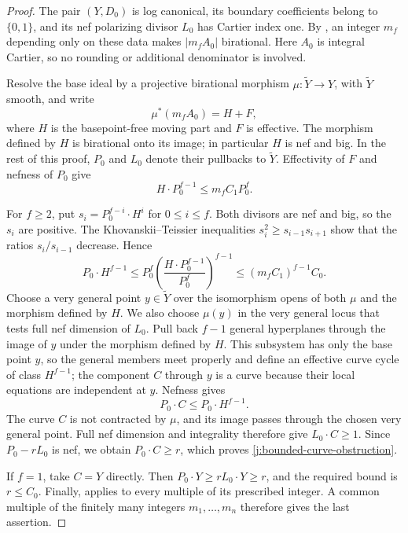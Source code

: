 \begin{proof}
The pair $(Y,D_0)$ is log canonical, its boundary coefficients belong
to $\{0,1\}$, and its nef polarizing divisor $L_0$ has Cartier index
one.  By \cite[Theorem~1.3]{BZ}, an integer $m_f$ depending only on
these data makes $|m_fA_0|$ birational.  Here $A_0$ is integral
Cartier, so no rounding or additional denominator is involved.

Resolve the base ideal by a projective birational morphism
$\mu:\widetilde Y\to Y$, with $\widetilde Y$ smooth, and write
\[
 \mu^*(m_fA_0)=H+F,
\]
where $H$ is the basepoint-free moving part and $F$ is effective.
The morphism defined by $H$ is birational onto its image; in
particular $H$ is nef and big.  In the rest of this proof, $P_0$
and $L_0$ denote their pullbacks to $\widetilde Y$.  Effectivity
of $F$ and nefness of $P_0$ give
\begin{equation}
\label{j:moving-adjoint-degree}
 H\cdot P_0^{f-1}\leq m_fC_1P_0^f.
\end{equation}

For $f\geq2$, put $s_i=P_0^{f-i}\cdot H^i$ for $0\leq i\leq f$.
Both divisors are nef and big, so the $s_i$ are positive.  The
Khovanskii--Teissier inequalities
\cite[Corollary~1.6.3(i) and Example~1.6.4]{LazarsfeldPAGI}
$s_i^2\geq s_{i-1}s_{i+1}$ show
that the ratios $s_i/s_{i-1}$ decrease.  Hence
\begin{equation}
\label{j:mixed-degree}
 P_0\cdot H^{f-1}
 \leq P_0^f\left(\frac{H\cdot P_0^{f-1}}{P_0^f}\right)^{f-1}
 \leq(m_fC_1)^{f-1}C_0.
\end{equation}
Choose a very general point $y\in\widetilde Y$ over the
isomorphism opens of both $\mu$ and the morphism defined by $H$.
We also choose $\mu(y)$ in the very general locus
that tests full nef dimension of $L_0$.  Pull back $f-1$ general
hyperplanes through the image of $y$ under the morphism defined
by $H$.  This subsystem has only the base point $y$, so the
general members meet properly and define an effective curve cycle
of class $H^{f-1}$; the component $C$ through $y$ is a curve
because their local equations are independent at $y$.
Nefness gives
\[
 P_0\cdot C\leq P_0\cdot H^{f-1}.
\]
The curve $C$ is not contracted by $\mu$, and its image passes
through the chosen very general point.  Full nef dimension and
integrality therefore give $L_0\cdot C\geq1$.  Since
$P_0-rL_0$ is nef, we obtain $P_0\cdot C\geq r$, which proves
\eqref{j:bounded-curve-obstruction}.

If $f=1$, take $C=Y$ directly.  Then
$P_0\cdot Y\geq rL_0\cdot Y\geq r$, and the required bound is
$r\leq C_0$.  Finally, \cite[Theorem~1.3]{BZ} applies to every
multiple of its prescribed integer.  A common multiple of the
finitely many integers $m_1,\ldots,m_n$ therefore gives the last
assertion.
\end{proof}

